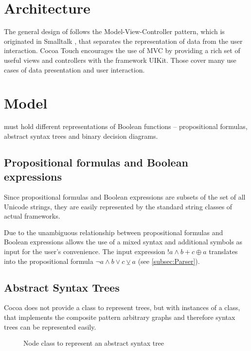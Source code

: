 
\section{Architecture}

The general design of \Nyaya follows the Model-View-Controller pattern,
which is originated in Smalltalk \cite[p.4]{GAMMAETAL}, 
that separates the representation of data from the user interaction.
Cocoa Touch  encourages the use of MVC 
by providing a rich set of useful views and controllers with the framework UIKit.
Those cover many use cases of data presentation and user interaction.

\section{Model}

\Nyaya must hold different representations of Boolean functions – propositional formulas, abstract syntax trees and binary decision diagrams. 

\subsection{Propositional formulas and Boolean expressions}
Since propositional formulas and Boolean expressions are subsets of the set of all Unicode strings,
they are easily represented by the standard string classes of actual frameworks. 

Due to the unambiguous relationship between propositional formulas and Boolean expressions 
\Nyaya allows the use of a mixed syntax and additional symbols as input
for the user's convenience. The input expression $!a \wedge b + c \oplus a$ translates into the propositional formula
$\neg a \wedge b \vee c \veebar a$ (see \vref{subsec:Parser}).

\subsection{Abstract Syntax Trees}

Cocoa does not provide a class to represent trees, 
but with instances of a class, 
that implements the composite pattern \cite[p.163ff]{GAMMAETAL}
arbitrary graphs and therefore syntax trees can be represented easily.

\begin{figure}[htbp]
\begin{center}
\caption{Node class to represent an abstract syntax tree}
\label{fig:NyayaNodeCluster}
\end{center}
\end{figure}

